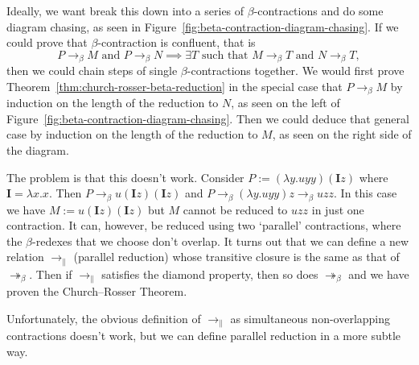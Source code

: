 \documentclass[a4paper, 11pt]{article}
\theoremstyle{plain}
\theoremstyle{definition}
\theoremstyle{remark}
\newcommand\bcon{\mathrel{\rightarrow_\beta}}
\newcommand\bred{\mathrel{\twoheadrightarrow_\beta}}
\newcommand\pred{\mathrel{\rightarrow_\parallel}}
\begin{document}
Ideally, we want break this down into a series of $\beta$-contractions and do some diagram chasing, as seen in Figure~\ref{fig:beta-contraction-diagram-chasing}. If we could prove that $\beta$-contraction is confluent, that is \[ P \bcon M \text{ and } P \bcon N \implies \exists T \text{ such that } M \bcon T \text{ and } N \bcon T, \] then we could chain steps of single $\beta$-contractions together. We would first prove Theorem~\ref{thm:church-rosser-beta-reduction} in the special case that $P \bcon M$ by induction on the length of the reduction to $N$, as seen on the left of Figure~\ref{fig:beta-contraction-diagram-chasing}. Then we could deduce that general case by induction on the length of the reduction to $M$, as seen on the right side of the diagram.

The problem is that this doesn't work. Consider ${P := (\lambda y . uyy) (\mathbf{I} z)}$ where $\mathbf{I} = \lambda x . x$. Then ${P \bcon u (\mathbf{I} z) (\mathbf{I} z)}$ and $P \bcon {(\lambda y . uyy) z} \bcon uzz$. In this case we have ${M := u (\mathbf{I} z) (\mathbf{I} z)}$ but $M$ cannot be reduced to $uzz$ in just one contraction. It can, however, be reduced using two `parallel' contractions, where the $\beta$-redexes that we choose don't overlap. It turns out that we can define a new relation $\pred$ (parallel reduction) whose transitive closure is the same as that of $\bred$. Then if $\pred$ satisfies the diamond property, then so does $\bred$ and we have proven the Church--Rosser Theorem. %

Unfortunately, the obvious definition of $\pred$ as simultaneous non-overlapping contractions doesn't work, but we can define parallel reduction in a more subtle way.
\end{document}
